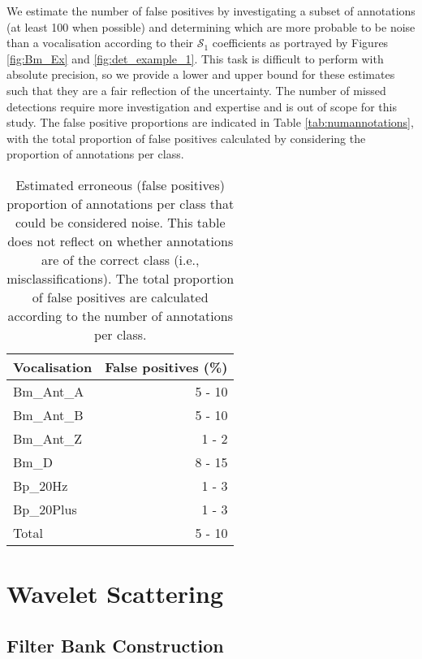{We estimate the number of false positives by investigating a subset of annotations (at least 100 when possible) and determining which are more probable to be noise than a vocalisation according to their $\mathcal{S}_1$ coefficients as portrayed by Figures \ref{fig:Bm_Ex} and \ref{fig:det_example_1}. This task is difficult to perform with absolute precision, so we provide a lower and upper bound for these estimates such that they are a fair reflection of the uncertainty. The number of missed detections require more investigation and expertise and is out of scope for this study. The false positive proportions are indicated in Table \ref{tab:numannotations}, with the total proportion of false positives calculated by considering the proportion of annotations per class.

\begin{table}[h!]
    \centering
\caption{Estimated erroneous (false positives) proportion of annotations per class that could be considered noise. This table does not reflect on whether annotations are of the correct class (i.e., misclassifications). The total proportion of false positives are calculated according to the number of annotations per class.}
\label{tab:errannotations}
\begin{tabular}{lr} 
\textbf{Vocalisation}      & \textbf{False positives (\%)} \\ \hline
Bm\_Ant\_A & 5 - 10                 \\
Bm\_Ant\_B & 5 - 10                  \\
Bm\_Ant\_Z & 1 - 2                  \\
Bm\_D      & 8 - 15                  \\
Bp\_20Hz & 1 - 3                   \\
Bp\_20Plus & 1 - 3                   \\
Total & 5 - 10\\ 
\end{tabular}
\end{table}


\clearpage

\section{Wavelet Scattering}
\subsection{Filter Bank Construction}

}
